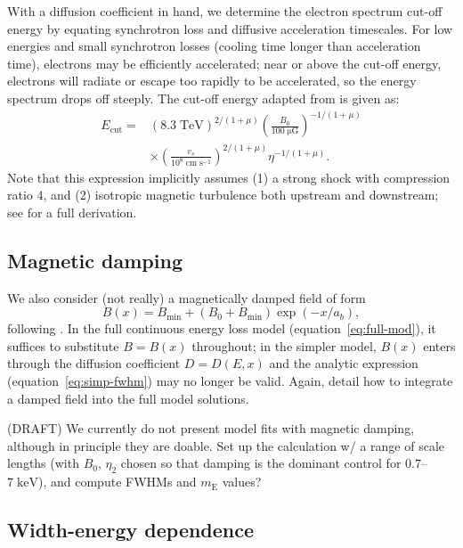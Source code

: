 \documentclass[iop, apj, numberedappendix, twocolappendix]{emulateapj}
\newcommand*{\mt}{\mathrm}
\newcommand*{\unit}[1]{\;\mt{#1}}  %
\newcommand*{\mE}{m_\mt{E}}
\newcommand*{\Ecut}{E_{\mt{cut}}}
\begin{document}
With a diffusion coefficient in hand, we determine the electron spectrum
cut-off energy by equating synchrotron loss and diffusive acceleration
timescales.  For low energies and small synchrotron losses (cooling time longer
than acceleration time), electrons may be efficiently accelerated; near or
above the cut-off energy, electrons will radiate or escape too rapidly to be
accelerated, so the energy spectrum drops off steeply.  The cut-off energy
adapted from \citet{parizot2006} is given as:
\begin{align}
    \Ecut =
        &\left(8.3\unit{TeV}\right)^{2/(1+\mu)}
        \left(\frac{B_0}{100 \unit{\mu G}}\right)^{-1/(1+\mu)} \nonumber \\
        &\times \left(\frac{v_s}{10^8 \unit{cm\;s^{-1}}}\right)^{2/(1+\mu)}
        \eta^{-1 / (1+\mu)} .
\end{align}
Note that this expression implicitly assumes (1) a strong shock with
compression ratio 4, and (2) isotropic magnetic turbulence both upstream and
downstream; see \citet{parizot2006} for a full derivation.

\subsection{Magnetic damping}

We also consider (not really) a magnetically damped field of form
\begin{equation}
    B(x) = B_{\mt{min}} + \left(B_0 + B_{\mt{min}}\right) \exp\left(-x / a_b\right) ,
\end{equation}
following \citet{pohl2005}.
In the full continuous energy loss model (equation~\eqref{eq:full-mod}), it
suffices to substitute $B = B(x)$ throughout; in the simpler model, $B(x)$
enters through the diffusion coefficient $D = D(E,x)$ and the analytic
expression (equation~\eqref{eq:simp-fwhm}) may no longer be valid.
Again,  detail how to integrate a damped field into the
full model solutions.

(DRAFT) We currently do not present model fits with magnetic damping, although
in principle they are doable.  Set up the calculation w/ a range of scale
lengths (with $B_0$, $\eta_2$ chosen so that damping is the dominant control
for $0.7$--$7 \unit{keV}$), and compute FWHMs and $\mE$ values?

\subsection{Width-energy dependence}
\end{document}
